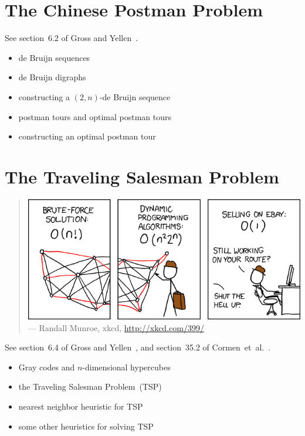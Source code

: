 
\section{The Chinese Postman Problem}

See section~6.2 of Gross and Yellen~\cite{GrossYellen1999}.

\begin{itemize}
\item de Bruijn sequences

\item de Bruijn digraphs

\item constructing a $(2, n)$-de Bruijn sequence

\item postman tours and optimal postman tours

\item constructing an optimal postman tour
\end{itemize}



\section{The Traveling Salesman Problem}

\begin{quote}
\includegraphics[scale=0.5]{image/travelling-salesman-problem} \\
\noindent
--- Randall Munroe, xkcd,
\url{http://xkcd.com/399/}
\end{quote}

\noindent
See section~6.4 of Gross and Yellen~\cite{GrossYellen1999}, and
section~35.2 of Cormen~et~al.~\cite{CormenEtAl2001}.

\begin{itemize}
\item Gray codes and $n$-dimensional hypercubes

\item the Traveling Salesman Problem~(TSP)

\item nearest neighbor heuristic for TSP

\item some other heuristics for solving TSP
\end{itemize}
